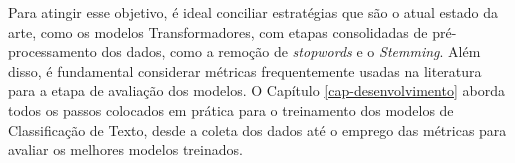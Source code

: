 Para atingir esse objetivo, é ideal conciliar estratégias que são o atual estado da arte, como os modelos Transformadores, com etapas consolidadas de pré-processamento dos dados, como a remoção de \textit{stopwords} e o \textit{Stemming}. Além disso, é fundamental considerar métricas frequentemente usadas na literatura para a etapa de avaliação dos modelos.  O Capítulo \ref{cap-desenvolvimento} aborda todos os passos colocados em prática para o treinamento dos modelos de Classificação de Texto, desde a coleta dos dados até o emprego das métricas para avaliar os melhores modelos treinados.